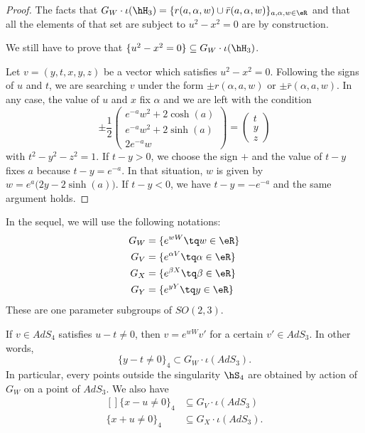 	\begin{proof}
		The facts that $G_W\cdot\iota(\hH_3)=\{ r(a,\alpha,w)\cup\bar r(a,\alpha,w) \}_{a,\alpha,w\in\eR}$ and that all the elements of that set are subject to $u^2-x^2=0$ are by construction.

		We still have to prove that $\{ u^2-x^2=0\}\subseteq G_W\cdot\iota(\hH_3)$.

		Let $v=(y,t,x,y,z)$ be a vector which satisfies $u^2-x^2=0$. Following the signs of $u$ and $t$, we are searching $v$ under the form $\pm r(\alpha,a,w)$ or $\pm \bar r(\alpha,a,w)$. In any case, the value of $u$ and $x$ fix $\alpha$ and we are left with the condition
		\begin{equation}
			\pm\frac{ 1 }{2}
			\begin{pmatrix}
				e^{-a}w^2+2\cosh(a) \\
				e^{-a}w^2+2\sinh(a) \\
				2 e^{-a}w
			\end{pmatrix}
			=
			\begin{pmatrix}
				t \\
				y \\
				z
			\end{pmatrix}
		\end{equation}
		with $t^2-y^2-z^2=1$.  If $t-y>0$, we choose the sign $+$ and the value of $t-y$ fixes $a$ because $t-y= e^{-a}$. In that situation, $w$ is given by $w= e^{a}\big(2y-2\sinh(a)\big)$. If $t-y<0$, we have $t-y=- e^{-a}$ and the same argument holds.

	\end{proof}

	In the sequel, we will use the following notations:
	\begin{equation}
		\begin{aligned}[]
			G_W & =\{  e^{wW}\tq w\in\eR \}            \\
			G_V & =\{  e^{\alpha V}\tq \alpha\in\eR \} \\
			G_X & =\{  e^{\beta X}\tq \beta\in\eR \}   \\
			G_Y & =\{  e^{y Y}\tq y\in\eR \}
		\end{aligned}
	\end{equation}
	These are one parameter subgroups of $SO(2,3)$.

	\begin{proposition}		\label{PropInclusionsTroisQuatreWVXY}
		If $v\in AdS_4$ satisfies $u-t\neq 0$, then $v= e^{wW}v'$ for a certain $v'\in AdS_3$. In other words,
		\begin{equation}
			\{ y-t\neq 0 \}_4\subset G_W\cdot\iota(AdS_3).
		\end{equation}
		In particular, every points outside the singularity $\hS_4$ are obtained by action of $G_W$ on a point of $AdS_3$. We also have
		\begin{equation}
			\begin{aligned}[]
				\{ x-u\neq 0 \}_4 & \subseteq G_V\cdot\iota(AdS_3)  \\
				\{ x+u\neq 0 \}_4 & \subseteq G_X\cdot\iota(AdS_3).
			\end{aligned}
		\end{equation}
	\end{proposition}


